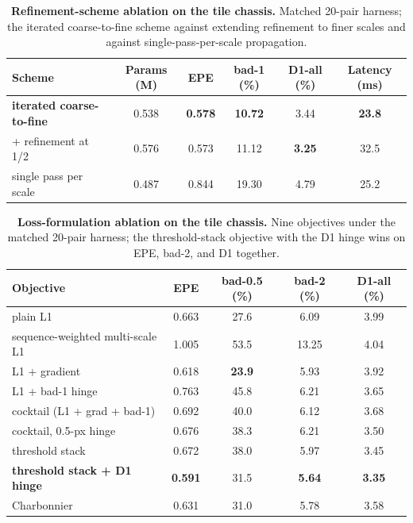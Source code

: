 \begin{table}[!htbp]
\centering
\caption{\textbf{Refinement-scheme ablation on the tile chassis.} Matched 20-pair harness; the iterated coarse-to-fine scheme against extending refinement to finer scales and against single-pass-per-scale propagation.}
\label{tab:ablation_refinement}
\small
\begin{tabular}{lccccc}
\toprule
Scheme & Params (M) & EPE & bad-1 (\%) & D1-all (\%) & Latency (ms)\\
\midrule
\textbf{iterated coarse-to-fine} & 0.538 & \textbf{0.578} & \textbf{10.72} & 3.44 & \textbf{23.8}\\
+ refinement at 1/2 & 0.576 & 0.573 & 11.12 & \textbf{3.25} & 32.5\\
single pass per scale & 0.487 & 0.844 & 19.30 & 4.79 & 25.2\\
\bottomrule
\end{tabular}
\end{table}

\begin{table}[!htbp]
\centering
\caption{\textbf{Loss-formulation ablation on the tile chassis.} Nine objectives under the matched 20-pair harness; the threshold-stack objective with the D1 hinge wins on EPE, bad-2, and D1 together.}
\label{tab:ablation_loss}
\small
\begin{tabular}{lcccc}
\toprule
Objective & EPE & bad-0.5 (\%) & bad-2 (\%) & D1-all (\%)\\
\midrule
plain L1 & 0.663 & 27.6 & 6.09 & 3.99\\
sequence-weighted multi-scale L1 & 1.005 & 53.5 & 13.25 & 4.04\\
L1 + gradient & 0.618 & \textbf{23.9} & 5.93 & 3.92\\
L1 + bad-1 hinge & 0.763 & 45.8 & 6.21 & 3.65\\
cocktail (L1 + grad + bad-1) & 0.692 & 40.0 & 6.12 & 3.68\\
cocktail, 0.5-px hinge & 0.676 & 38.3 & 6.21 & 3.50\\
threshold stack & 0.672 & 38.0 & 5.97 & 3.45\\
\textbf{threshold stack + D1 hinge} & \textbf{0.591} & 31.5 & \textbf{5.64} & \textbf{3.35}\\
Charbonnier & 0.631 & 31.0 & 5.78 & 3.58\\
\bottomrule
\end{tabular}
\end{table}

\FloatBarrier
